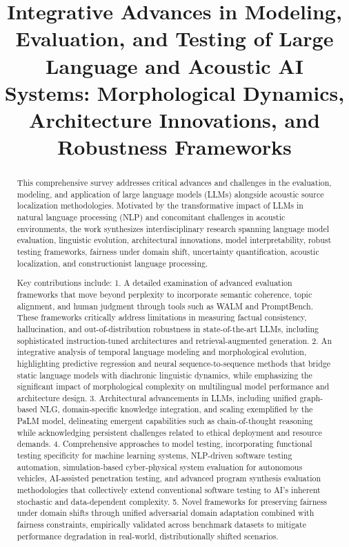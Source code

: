 \documentclass[sigconf]{acmart}
\title{Integrative Advances in Modeling, Evaluation, and Testing of Large Language and Acoustic AI Systems: Morphological Dynamics, Architecture Innovations, and Robustness Frameworks}
\begin{document}
\begin{abstract}
This comprehensive survey addresses critical advances and challenges in the evaluation, modeling, and application of large language models (LLMs) alongside acoustic source localization methodologies. Motivated by the transformative impact of LLMs in natural language processing (NLP) and concomitant challenges in acoustic environments, the work synthesizes interdisciplinary research spanning language model evaluation, linguistic evolution, architectural innovations, model interpretability, robust testing frameworks, fairness under domain shift, uncertainty quantification, acoustic localization, and constructionist language processing.

Key contributions include:  
1. A detailed examination of advanced evaluation frameworks that move beyond perplexity to incorporate semantic coherence, topic alignment, and human judgment through tools such as WALM and PromptBench. These frameworks critically address limitations in measuring factual consistency, hallucination, and out-of-distribution robustness in state-of-the-art LLMs, including sophisticated instruction-tuned architectures and retrieval-augmented generation.  
2. An integrative analysis of temporal language modeling and morphological evolution, highlighting predictive regression and neural sequence-to-sequence methods that bridge static language models with diachronic linguistic dynamics, while emphasizing the significant impact of morphological complexity on multilingual model performance and architecture design.  
3. Architectural advancements in LLMs, including unified graph-based NLG, domain-specific knowledge integration, and scaling exemplified by the PaLM model, delineating emergent capabilities such as chain-of-thought reasoning while acknowledging persistent challenges related to ethical deployment and resource demands.  
4. Comprehensive approaches to model testing, incorporating functional testing specificity for machine learning systems, NLP-driven software testing automation, simulation-based cyber-physical system evaluation for autonomous vehicles, AI-assisted penetration testing, and advanced program synthesis evaluation methodologies that collectively extend conventional software testing to AI's inherent stochastic and data-dependent complexity.  
5. Novel frameworks for preserving fairness under domain shifts through unified adversarial domain adaptation combined with fairness constraints, empirically validated across benchmark datasets to mitigate performance degradation in real-world, distributionally shifted scenarios.  

\end{abstract}
\end{document}

